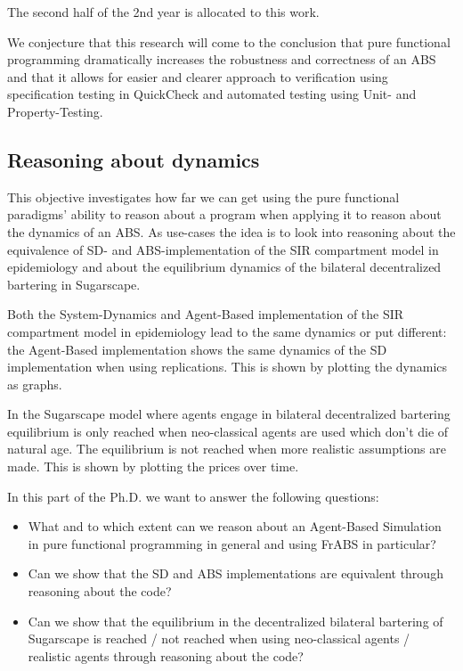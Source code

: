 The second half of the 2nd year is allocated to this work.

We conjecture that this research will come to the conclusion that pure functional programming dramatically increases the robustness and correctness of an ABS and that it allows for easier and clearer approach to verification using specification testing in QuickCheck and automated testing using Unit- and Property-Testing.

\subsection{Reasoning about dynamics}
This objective investigates how far we can get using the pure functional paradigms' ability to reason about a program when applying it to reason about the dynamics of an ABS. As use-cases the idea is to look into reasoning about the equivalence of SD- and ABS-implementation of the SIR compartment model in epidemiology and about the equilibrium dynamics of the bilateral decentralized bartering in Sugarscape.

Both the System-Dynamics and Agent-Based implementation of the SIR compartment model in epidemiology lead to the same dynamics or put different: the Agent-Based implementation shows the same dynamics of the SD implementation when using replications. This is shown by plotting the dynamics as graphs. 

In the Sugarscape model where agents engage in bilateral decentralized bartering equilibrium is only reached when neo-classical agents are used which don't die of natural age. The equilibrium is not reached when more realistic assumptions are made. This is shown by plotting the prices over time. 

In this part of the Ph.D. we want to answer the following questions:
\begin{itemize}
	\item What and to which extent can we reason about an Agent-Based Simulation in pure functional programming in general and using FrABS in particular?
	\item Can we show that the SD and ABS implementations are equivalent through reasoning about the code?
	\item Can we show that the equilibrium in the decentralized bilateral bartering of Sugarscape is reached / not reached when using neo-classical agents / realistic agents through reasoning about the code?
\end{itemize}

